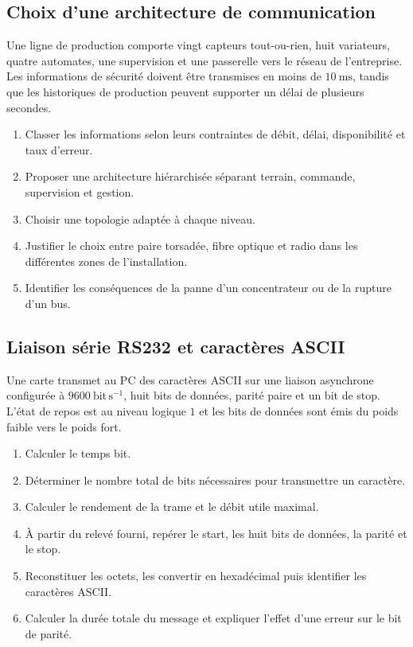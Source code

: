 
\subsection{Choix d'une architecture de communication}

Une ligne de production comporte vingt capteurs tout-ou-rien, huit variateurs, quatre automates, une supervision et une passerelle vers le réseau de l'entreprise. Les informations de sécurité doivent être transmises en moins de $10\ \mathrm{ms}$, tandis que les historiques de production peuvent supporter un délai de plusieurs secondes.

\begin{enumerate}
  \item Classer les informations selon leurs contraintes de débit, délai, disponibilité et taux d'erreur.
  \item Proposer une architecture hiérarchisée séparant terrain, commande, supervision et gestion.
  \item Choisir une topologie adaptée à chaque niveau.
  \item Justifier le choix entre paire torsadée, fibre optique et radio dans les différentes zones de l'installation.
  \item Identifier les conséquences de la panne d'un concentrateur ou de la rupture d'un bus.
\end{enumerate}

\subsection{Liaison série RS232 et caractères ASCII}

Une carte transmet au PC des caractères ASCII sur une liaison asynchrone configurée à $9600\ \mathrm{bit\,s^{-1}}$, huit bits de données, parité paire et un bit de stop. L'état de repos est au niveau logique $1$ et les bits de données sont émis du poids faible vers le poids fort.


\begin{enumerate}
  \item Calculer le temps bit.
  \item Déterminer le nombre total de bits nécessaires pour transmettre un caractère.
  \item Calculer le rendement de la trame et le débit utile maximal.
  \item À partir du relevé fourni, repérer le start, les huit bits de données, la parité et le stop.
  \item Reconstituer les octets, les convertir en hexadécimal puis identifier les caractères ASCII.
  \item Calculer la durée totale du message et expliquer l'effet d'une erreur sur le bit de parité.
\end{enumerate}

